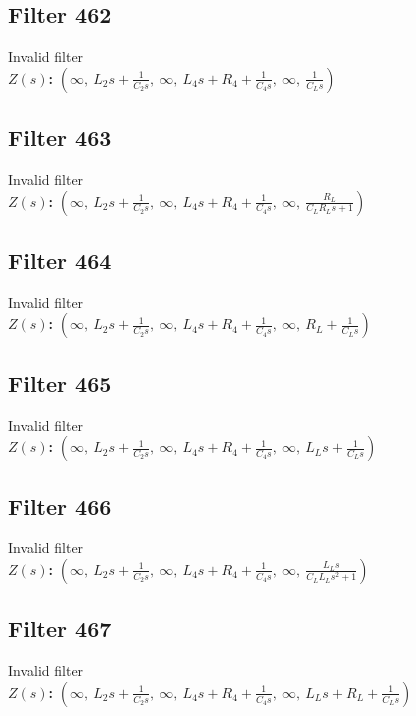 \documentclass{article}
\begin{document}
\subsection*{Filter 462}
Invalid filter \\ 
\textbf{$Z(s)$:} $\left( \infty, \  L_{2} s + \frac{1}{C_{2} s}, \  \infty, \  L_{4} s + R_{4} + \frac{1}{C_{4} s}, \  \infty, \  \frac{1}{C_{L} s}\right)$ \\ 
\subsection*{Filter 463}
Invalid filter \\ 
\textbf{$Z(s)$:} $\left( \infty, \  L_{2} s + \frac{1}{C_{2} s}, \  \infty, \  L_{4} s + R_{4} + \frac{1}{C_{4} s}, \  \infty, \  \frac{R_{L}}{C_{L} R_{L} s + 1}\right)$ \\ 
\subsection*{Filter 464}
Invalid filter \\ 
\textbf{$Z(s)$:} $\left( \infty, \  L_{2} s + \frac{1}{C_{2} s}, \  \infty, \  L_{4} s + R_{4} + \frac{1}{C_{4} s}, \  \infty, \  R_{L} + \frac{1}{C_{L} s}\right)$ \\ 
\subsection*{Filter 465}
Invalid filter \\ 
\textbf{$Z(s)$:} $\left( \infty, \  L_{2} s + \frac{1}{C_{2} s}, \  \infty, \  L_{4} s + R_{4} + \frac{1}{C_{4} s}, \  \infty, \  L_{L} s + \frac{1}{C_{L} s}\right)$ \\ 
\subsection*{Filter 466}
Invalid filter \\ 
\textbf{$Z(s)$:} $\left( \infty, \  L_{2} s + \frac{1}{C_{2} s}, \  \infty, \  L_{4} s + R_{4} + \frac{1}{C_{4} s}, \  \infty, \  \frac{L_{L} s}{C_{L} L_{L} s^{2} + 1}\right)$ \\ 
\subsection*{Filter 467}
Invalid filter \\ 
\textbf{$Z(s)$:} $\left( \infty, \  L_{2} s + \frac{1}{C_{2} s}, \  \infty, \  L_{4} s + R_{4} + \frac{1}{C_{4} s}, \  \infty, \  L_{L} s + R_{L} + \frac{1}{C_{L} s}\right)$ \\ 
\end{document}
